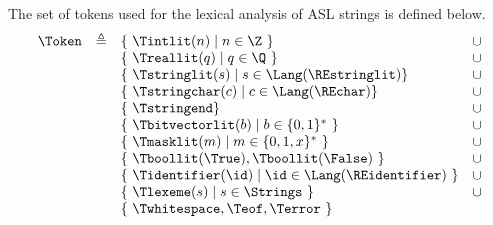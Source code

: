 \hypertarget{def-token}{}
The set of tokens used for the lexical analysis of ASL strings is defined below.
\[
\begin{array}{rcll}
\Token &\triangleq& \{\ \Tintlit(n) \;|\; n\in\Z\ \} & \cup\\
        & & \{\ \Treallit(q) \;|\; q\in\Q\ \} & \cup\\
        & & \{\ \Tstringlit(s) \;|\; s\in \Lang(\REstringlit) \} & \cup\\
        & & \{\ \Tstringchar(c) \;|\; c \in \Lang(\REchar) \} & \cup\\
        & & \{\ \Tstringend \} & \cup\\
        & & \{\ \Tbitvectorlit(b) \;|\; b\in\{0,1\}^*\ \} & \cup\\
        & & \{\ \Tmasklit(m) \;|\; m\in\{0,1,x\}^*\ \} & \cup\\
        & & \{\ \Tboollit(\True), \Tboollit(\False)\ \} & \cup \\
        & & \{\ \Tidentifier(\id) \;|\; \id\in \Lang(\REidentifier)\ \} & \cup \\
        & & \{\ \Tlexeme(s) \;|\; s\in\Strings\ \} & \cup \\
        & & \{\ \Twhitespace, \Teof, \Terror\ \} &
\end{array}
\]

